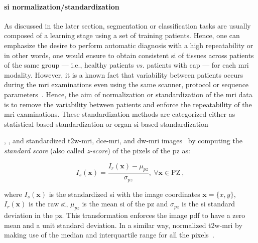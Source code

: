 \paragraph{\Ac{si} normalization/standardization} As discussed in the later section, segmentation or classification tasks are usually composed of a learning stage using a set of training patients.
Hence, one can emphasize the desire to perform automatic diagnosis with a high repeatability or in other words, one would ensure to obtain consistent \ac{si} of tissues across patients of the same group --- i.e., healthy patients \textit{vs.} patients with \ac{cap} --- for each \ac{mri} modality.
However, it is a known fact that variability between patients occurs during the \ac{mri} examinations even using the same scanner, protocol or sequence parameters~\cite{Nyul1999}.
Hence, the aim of normalization or standardization of the \ac{mri} data is to remove the variability between patients and enforce the repeatability of the \ac{mri} examinations.
These standardization methods are categorized either as statistical-based standardization or organ \ac{si}-based standardization

\citeauthor{Artan2010}, \citeauthor{Ozer2010}, and \citeauthor{rampun2016quantitative} standardized \ac{t2w}-\ac{mri}, \ac{dce}-\ac{mri}, and \ac{dw}-\ac{mri} images~\cite{Artan2009,Artan2010,Ozer2009,Ozer2010,rampun2015classifying,rampun2015computer,rampun2016computer,rampun2016computerb,rampun2016quantitative} by computing the \textit{standard score} (also called \textit{z-score}) of the pixels of the \ac{pz} as:

\begin{equation}
	I_s(\mathbf{x}) = \frac{ I_r(\mathbf{x}) - \mu_{pz}}{\sigma_{pz}}, \ \forall \mathbf{x} \in \text{PZ} \ ,
	\label{eq:meansta}
\end{equation}

\noindent where $I_s(\mathbf{x})$ is the standardized \ac{si} with the image coordinates $\mathbf{x} = \{x,y\}$, $I_r(\mathbf{x})$ is the raw \ac{si}, $\mu_{pz}$ is the mean \ac{si} of the \ac{pz} and $\sigma_{pz}$ is the \ac{si} standard deviation in the \ac{pz}.
This transformation enforces the image \ac{pdf} to have a zero mean and a unit standard deviation.
In a similar way, \citeauthor{Liu2013} normalized \ac{t2w}-\ac{mri} by making use of the median and interquartile range for all the pixels~\cite{Liu2013}.

